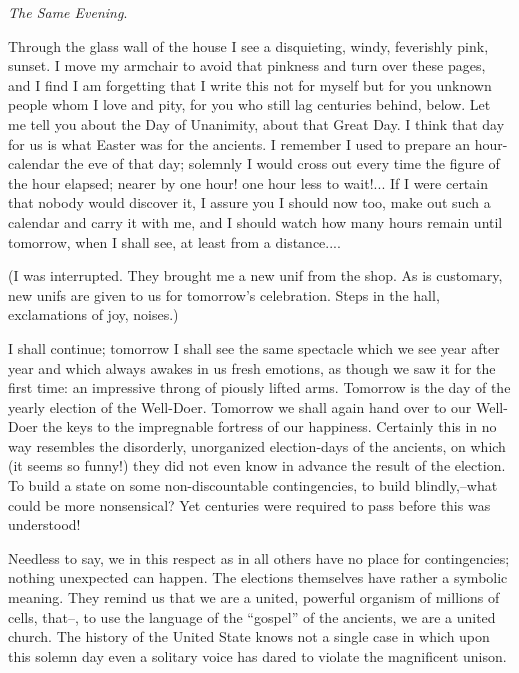 \documentclass[11pt,openany]{book}
\begin{document}
\emph{The Same Evening}.

Through the glass wall of the house I see a disquieting, windy, feverishly pink, sunset. I move my armchair to avoid that pinkness and turn over these pages, and I find I am forgetting that I write this not for myself but for you unknown people whom I love and pity, for you who still lag centuries behind, below. Let me tell you about the Day of Unanimity, about that Great Day. I think that day for us is what Easter was for the ancients. I remember I used to prepare an hour-calendar the eve of that day; solemnly I would cross out every time the figure of the hour elapsed; nearer by one hour! one hour less to wait!... If I were certain that nobody would discover it, I assure you I should now too, make out such a calendar and carry it with me, and I should watch how many hours remain until tomorrow, when I shall see, at least from a distance....

(I was interrupted. They brought me a new unif from the shop. As is customary, new unifs are given to us for tomorrow's celebration. Steps in the hall, exclamations of joy, noises.)

I shall continue; tomorrow I shall see the same spectacle which we see year after year and which always awakes in us fresh emotions, as though we saw it for the first time: an impressive throng of piously lifted arms. Tomorrow is the day of the yearly election of the Well-Doer. Tomorrow we shall again hand over to our Well-Doer the keys to the impregnable fortress of our happiness. Certainly this in no way resembles the disorderly, unorganized election-days of the ancients, on which (it seems so funny!) they did not even know in advance the result of the election. To build a state on some non-discountable contingencies, to build blindly,--what could be more nonsensical? Yet centuries were required to pass before this was understood!

Needless to say, we in this respect as in all others have no place for contingencies; nothing unexpected can happen. The elections themselves have rather a symbolic meaning. They remind us that we are a united, powerful organism of millions of cells, that--, to use the language of the ``gospel'' of the ancients, we are a united church. The history of the United State knows not a single case in which upon this solemn day even a solitary voice has dared to violate the magnificent unison.
\end{document}
